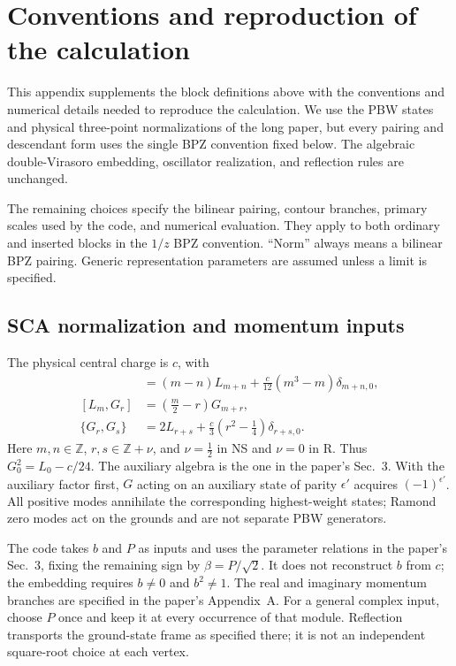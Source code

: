 \section{Conventions and reproduction of the calculation}
\label{app:conventions}

This appendix supplements the block definitions above with the conventions
and numerical details needed to reproduce the calculation. We use the
PBW states and physical three-point normalizations of the long
paper, but every pairing and descendant form uses the single BPZ
convention fixed below. The algebraic double-Virasoro embedding,
oscillator realization, and reflection rules are unchanged.

The remaining choices specify the bilinear pairing, contour branches,
primary scales used by the code, and numerical evaluation. They
apply to both ordinary and inserted blocks in the $1/z$ BPZ convention.
``Norm'' always means a bilinear BPZ pairing. Generic representation
parameters are assumed unless a limit is specified.

\subsection{SCA normalization and momentum inputs}
\label{app:algebra}

The physical central charge is $c$, with
\begin{align}
 [L_m,L_n]&=(m-n)L_{m+n}
       +\frac{c}{12}(m^3-m)\delta_{m+n,0},\nonumber\\
 [L_m,G_r]&=\left(\frac m2-r\right)G_{m+r},\nonumber\\
 \{G_r,G_s\}&=2L_{r+s}
       +\frac c3\left(r^2-\frac14\right)\delta_{r+s,0}.
 \label{eq:app-sca}
\end{align}
Here $m,n\in\mathbb Z$, $r,s\in\mathbb Z+\nu$, and
$\nu=\frac12$ in NS and $\nu=0$ in R. Thus $G_0^2=L_0-c/24$.
The auxiliary algebra is the one in the paper's Sec.~3. With the
auxiliary factor first, $G$ acting on an auxiliary state of parity
$\epsilon'$ acquires $(-1)^{\epsilon'}$.
All positive modes annihilate the corresponding highest-weight states;
Ramond zero modes act on the grounds and are not separate PBW generators.

The code takes $b$ and $P$ as inputs and uses the parameter relations
in the paper's Sec.~3, fixing the remaining sign by $\beta=P/\sqrt2$.
It does not reconstruct $b$ from $c$; the embedding requires
$b\ne0$ and $b^2\ne1$. The real and imaginary momentum branches are
specified in the paper's Appendix~A. For a general complex input,
choose $P$ once and keep it at every occurrence of that module.
Reflection transports the ground-state frame as specified there;
it is not an independent square-root choice at each vertex.

